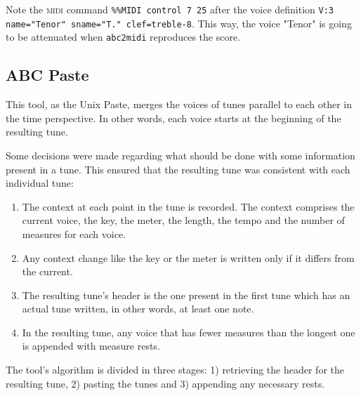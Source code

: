 \documentclass[a4paper,UKenglish]{oasics}
\newcommand{\midi}{\textsc{midi} }
\newcommand{\abctomidi}{\texttt{abc2midi}}
\begin{document}
    \begin{center}
      \begin{minipage}{.49\textwidth}
        
      \end{minipage}
      \hfill
      \begin{minipage}{.49\textwidth}
        
      \end{minipage}
    \end{center}

    Note the \midi command \texttt{\%\%MIDI control 7 25} after the voice definition \texttt{V:3
    name="Tenor" sname="T." clef=treble-8}. This way, the voice "Tenor" is going to be attenuated
    when \abctomidi{} reproduces the score.

\subsection{ABC Paste}

This tool, as the Unix Paste, merges the voices of tunes parallel to each other in the time
perspective. In other words, each voice starts at the beginning of the resulting tune.

Some decisions were made regarding what should be done with some information present in a tune. This
ensured that the resulting tune was consistent with each individual tune:

\begin{enumerate}
  \item The context at each point in the tune is recorded. The context comprises the current voice,
    the key, the meter, the length, the tempo and the number of measures for each voice.
  \item Any context change like the key or the meter is written only if it differs from the current.
  \item The resulting tune's header is the one present in the first tune which has an actual tune
    written, in other words, at least one note.
  \item In the resulting tune, any voice that has fewer measures than the longest one is appended
    with measure rests.
\end{enumerate}

The tool's algorithm is divided in three stages: 1) retrieving the header for the resulting tune, 2)
pasting the tunes and 3) appending any necessary rests.\\
\end{document}
